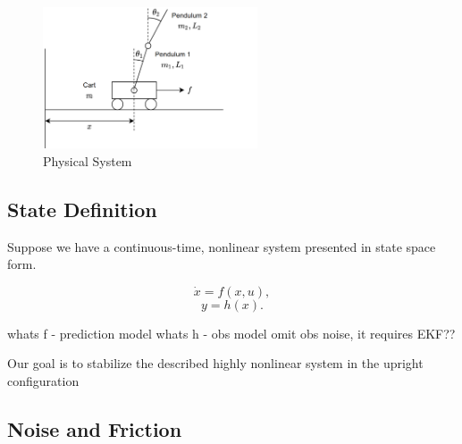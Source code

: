 \documentclass[journal]{IEEEtran}
\begin{document}

\begin{figure}[!t]
    \centering
    \includegraphics[width=2.5in]{fig01_cart001.png}
    \caption{Physical System}
    \label{fig_sim}
\end{figure}


\subsection{State Definition}
Suppose we have a continuous-time, nonlinear system presented in state space
form.

\begin{equation}
    \dot{x} = f(x,u),
\end{equation}
\begin{equation}
    y = h(x).
\end{equation}

whats f - prediction model
whats h - obs model
omit obs noise, it requires EKF??

Our goal is to stabilize the described highly nonlinear system in the upright
configuration

\subsection{Noise and Friction}
\end{document}

